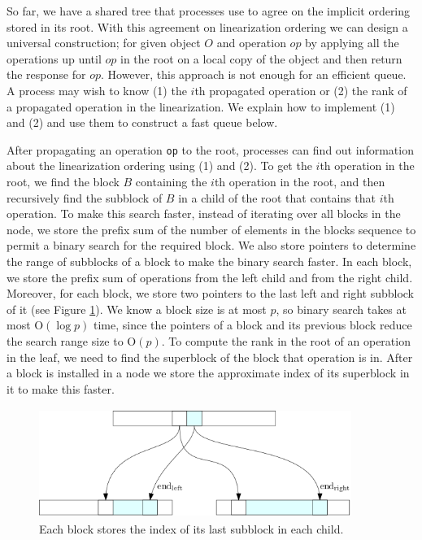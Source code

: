 \documentclass[10pt]{article}
\theoremstyle{definition}
\begin{document}
So far, we have a shared tree that processes use to agree on the implicit ordering stored in its root. With this agreement on linearization ordering we can design a universal construction; for given object $O$ and operation $op$ by applying all the operations up until $op$ in the root on a local copy of the object and then return the response for $op$. However, this approach is not enough for an efficient queue.
A process may wish to know (1) the $i$th propagated operation or (2) the rank of a propagated operation in the linearization. We explain how to implement (1) and (2) and use them to construct a fast queue below.

After propagating an operation \texttt{op} to the root, processes can find out information about the linearization ordering using (1) and (2). 
To get the $i$th operation in the root, we find the block $B$ containing the $i$th operation in the root, and then recursively find the subblock of $B$ in a child of the root that contains that $i$th operation. To make this search faster, instead of iterating over all blocks in the node, we store the prefix sum of the number of elements in the blocks sequence to permit a binary search for the required block. We also store pointers to determine the range of subblocks of a block to make the binary search faster. In each block, we store the prefix sum of operations from the left child and from the right child. Moreover, for each block, we store two pointers to the last left and right subblock of it (see Figure \ref{fig::pointer}). We know a block size is at most $p$, so binary search takes at most \textsc{O}$(\log p)$ time, since the pointers of a block and its previous block reduce the search range size to \textsc{O}$(p)$.
To compute the rank in the root of an operation in the leaf, we need to find the superblock of the block that operation is in. After a block is installed in a node we store the approximate index of its superblock in it to make this faster.

\begin{figure}[hbtp]
\centering
  \includegraphics[width=4in, height=1.4in]{pics/pointers}
  \caption{Each block stores the index of its last subblock in each child. \label{fig::pointer}}
\end{figure}
\end{document}
